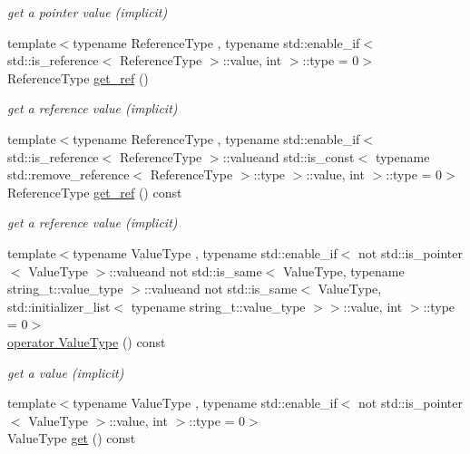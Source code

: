\begin{DoxyCompactItemize}
\begin{DoxyCompactList}\small\item\em get a pointer value (implicit) \end{DoxyCompactList}\item 
{\footnotesize template$<$typename Reference\-Type , typename std\-::enable\-\_\-if$<$ std\-::is\-\_\-reference$<$ Reference\-Type $>$\-::value, int $>$\-::type  = 0$>$ }\\Reference\-Type \hyperlink{classnlohmann_1_1basic__json_a4f332e90f3cae562d0c3fa6ba48f74f9}{get\-\_\-ref} ()
\begin{DoxyCompactList}\small\item\em get a reference value (implicit) \end{DoxyCompactList}\item 
{\footnotesize template$<$typename Reference\-Type , typename std\-::enable\-\_\-if$<$ std\-::is\-\_\-reference$<$ Reference\-Type $>$\-::valueand std\-::is\-\_\-const$<$ typename std\-::remove\-\_\-reference$<$ Reference\-Type $>$\-::type $>$\-::value, int $>$\-::type  = 0$>$ }\\Reference\-Type \hyperlink{classnlohmann_1_1basic__json_aa669d997ddc03566de5438781254b32b}{get\-\_\-ref} () const 
\begin{DoxyCompactList}\small\item\em get a reference value (implicit) \end{DoxyCompactList}\item 
{\footnotesize template$<$typename Value\-Type , typename std\-::enable\-\_\-if$<$ not std\-::is\-\_\-pointer$<$ Value\-Type $>$\-::valueand not std\-::is\-\_\-same$<$ Value\-Type, typename string\-\_\-t\-::value\-\_\-type $>$\-::valueand not std\-::is\-\_\-same$<$ Value\-Type, std\-::initializer\-\_\-list$<$ typename string\-\_\-t\-::value\-\_\-type $>$$>$\-::value, int $>$\-::type  = 0$>$ }\\\hyperlink{classnlohmann_1_1basic__json_aef496a56163710084e13612ab73e6ed2}{operator Value\-Type} () const 
\begin{DoxyCompactList}\small\item\em get a value (implicit) \end{DoxyCompactList}\item 
{\footnotesize template$<$typename Value\-Type , typename std\-::enable\-\_\-if$<$ not std\-::is\-\_\-pointer$<$ Value\-Type $>$\-::value, int $>$\-::type  = 0$>$ }\\Value\-Type \hyperlink{classnlohmann_1_1basic__json_a20bfb2ca6d4c421c74bb3e53328cd437}{get} () const 

\end{DoxyCompactItemize}
